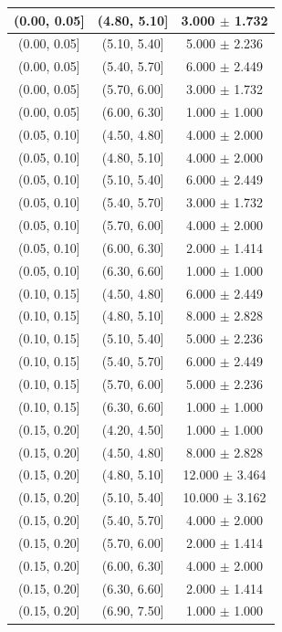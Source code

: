 \begin{longtable}{|c|c|c|}
\hline
\endlastfoot
(0.00, 0.05] & (4.80, 5.10] & 3.000 $\pm$ 1.732 \\ 
\hline
(0.00, 0.05] & (5.10, 5.40] & 5.000 $\pm$ 2.236 \\ 
\hline
(0.00, 0.05] & (5.40, 5.70] & 6.000 $\pm$ 2.449 \\ 
\hline
(0.00, 0.05] & (5.70, 6.00] & 3.000 $\pm$ 1.732 \\ 
\hline
(0.00, 0.05] & (6.00, 6.30] & 1.000 $\pm$ 1.000 \\ 
\hline
(0.05, 0.10] & (4.50, 4.80] & 4.000 $\pm$ 2.000 \\ 
\hline
(0.05, 0.10] & (4.80, 5.10] & 4.000 $\pm$ 2.000 \\ 
\hline
(0.05, 0.10] & (5.10, 5.40] & 6.000 $\pm$ 2.449 \\ 
\hline
(0.05, 0.10] & (5.40, 5.70] & 3.000 $\pm$ 1.732 \\ 
\hline
(0.05, 0.10] & (5.70, 6.00] & 4.000 $\pm$ 2.000 \\ 
\hline
(0.05, 0.10] & (6.00, 6.30] & 2.000 $\pm$ 1.414 \\ 
\hline
(0.05, 0.10] & (6.30, 6.60] & 1.000 $\pm$ 1.000 \\ 
\hline
(0.10, 0.15] & (4.50, 4.80] & 6.000 $\pm$ 2.449 \\ 
\hline
(0.10, 0.15] & (4.80, 5.10] & 8.000 $\pm$ 2.828 \\ 
\hline
(0.10, 0.15] & (5.10, 5.40] & 5.000 $\pm$ 2.236 \\ 
\hline
(0.10, 0.15] & (5.40, 5.70] & 6.000 $\pm$ 2.449 \\ 
\hline
(0.10, 0.15] & (5.70, 6.00] & 5.000 $\pm$ 2.236 \\ 
\hline
(0.10, 0.15] & (6.30, 6.60] & 1.000 $\pm$ 1.000 \\ 
\hline
(0.15, 0.20] & (4.20, 4.50] & 1.000 $\pm$ 1.000 \\ 
\hline
(0.15, 0.20] & (4.50, 4.80] & 8.000 $\pm$ 2.828 \\ 
\hline
(0.15, 0.20] & (4.80, 5.10] & 12.000 $\pm$ 3.464 \\ 
\hline
(0.15, 0.20] & (5.10, 5.40] & 10.000 $\pm$ 3.162 \\ 
\hline
(0.15, 0.20] & (5.40, 5.70] & 4.000 $\pm$ 2.000 \\ 
\hline
(0.15, 0.20] & (5.70, 6.00] & 2.000 $\pm$ 1.414 \\ 
\hline
(0.15, 0.20] & (6.00, 6.30] & 4.000 $\pm$ 2.000 \\ 
\hline
(0.15, 0.20] & (6.30, 6.60] & 2.000 $\pm$ 1.414 \\ 
\hline
(0.15, 0.20] & (6.90, 7.50] & 1.000 $\pm$ 1.000 \\ 

\end{longtable}
